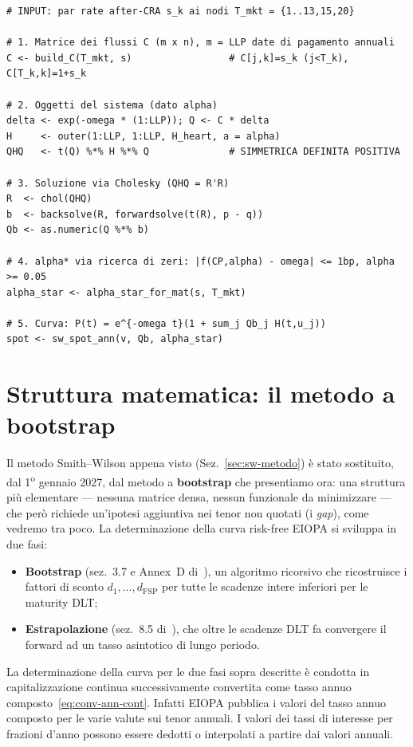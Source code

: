 \documentclass[11pt,a4paper]{article}
\theoremstyle{plain}
\theoremstyle{definition}
\theoremstyle{remark}
\newcommand{\UFR}{\mathrm{UFR}}
\newcommand{\FSP}{\mathrm{FSP}}
\begin{document}
\begin{algobox}
\begin{Verbatim}[fontsize=\small]
# INPUT: par rate after-CRA s_k ai nodi T_mkt = {1..13,15,20}

# 1. Matrice dei flussi C (m x n), m = LLP date di pagamento annuali
C <- build_C(T_mkt, s)                 # C[j,k]=s_k (j<T_k), C[T_k,k]=1+s_k

# 2. Oggetti del sistema (dato alpha)
delta <- exp(-omega * (1:LLP)); Q <- C * delta
H     <- outer(1:LLP, 1:LLP, H_heart, a = alpha)
QHQ   <- t(Q) %*% H %*% Q              # SIMMETRICA DEFINITA POSITIVA

# 3. Soluzione via Cholesky (QHQ = R'R)
R  <- chol(QHQ)
b  <- backsolve(R, forwardsolve(t(R), p - q))
Qb <- as.numeric(Q %*% b)

# 4. alpha* via ricerca di zeri: |f(CP,alpha) - omega| <= 1bp, alpha >= 0.05
alpha_star <- alpha_star_for_mat(s, T_mkt)

# 5. Curva: P(t) = e^{-omega t}(1 + sum_j Qb_j H(t,u_j))
spot <- sw_spot_ann(v, Qb, alpha_star)
\end{Verbatim}
\end{algobox}

\section{Struttura matematica: il metodo a bootstrap}
\label{sec:metodo}

Il metodo Smith--Wilson appena visto (Sez.~\ref{sec:sw-metodo}) \`e stato sostituito, dal
1\textsuperscript{o} gennaio 2027, dal metodo a \textbf{bootstrap} che presentiamo ora: una
struttura pi\`u elementare --- nessuna matrice densa, nessun funzionale da minimizzare ---
che per\`o richiede un'ipotesi aggiuntiva nei tenor non quotati (i \emph{gap}), come vedremo
tra poco. La determinazione della curva risk-free EIOPA si sviluppa in due fasi: \begin{itemize}
    \item \textbf{Bootstrap}
(sez.~3.7 e Annex~D di~\cite{eiopa2026}), un algoritmo ricorsivo che ricostruisce i fattori di
sconto $d_1,\ldots,d_{\FSP}$ per tutte le scadenze intere inferiori per le maturity DLT; %
\item \textbf{Estrapolazione}
(sez.~8.5 di~\cite{eiopa2026}), che oltre le scadenze DLT fa convergere il forward ad un tasso asintotico di lungo periodo. %
\end{itemize}  
La determinazione della curva per le due fasi sopra descritte \`e condotta in capitalizzazione continua 
successivamente convertita come tasso annuo composto~\eqref{eq:conv-ann-cont}. 
Infatti EIOPA pubblica i valori del tasso annuo composto per le varie valute sui tenor annuali. 
I valori dei tassi di interesse per frazioni d'anno possono essere dedotti o interpolati 
a partire dai valori annuali.
\end{document}
